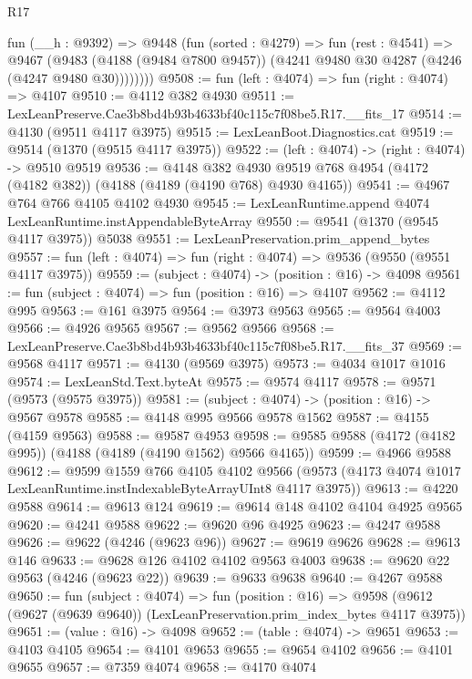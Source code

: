 \begin{lexlean}{R17}
\begin{coremodule}
        fun (__h : @9392) =>
        @9448
          (fun (sorted : @4279) =>
          fun (rest : @4541) =>
          @9467
            (@9483
              (@4188 (@9484 @7800 @9457))
              (@4241 @9480 @30 @4287 (@4246 (@4247 @9480 @30))))))))
@9508 := fun (left : @4074) => fun (right : @4074) => @4107
@9510 := @4112 @382 @4930
@9511 := LexLeanPreserve.Cae3b8bd4b93b4633bf40c115c7f08be5.R17.__fits_17
@9514 := @4130 (@9511 @4117 @3975)
@9515 := LexLeanBoot.Diagnostics.cat
@9519 := @9514 (@1370 (@9515 @4117 @3975))
@9522 := (left : @4074) -> (right : @4074) -> @9510 @9519
@9536 := @4148
    @382
    @4930
    @9519
    @768
    @4954
    (@4172 (@4182 @382))
    (@4188 (@4189 (@4190 @768) @4930 @4165))
@9541 := @4967 @764 @766 @4105 @4102 @4930
@9545 := LexLeanRuntime.append @4074 LexLeanRuntime.instAppendableByteArray
@9550 := @9541 (@1370 (@9545 @4117 @3975)) @5038
@9551 := LexLeanPreservation.prim_append_bytes
@9557 := fun (left : @4074) => fun (right : @4074) => @9536 (@9550 (@9551 @4117 @3975))
@9559 := (subject : @4074) -> (position : @16) -> @4098
@9561 := fun (subject : @4074) => fun (position : @16) => @4107
@9562 := @4112 @995
@9563 := @161 @3975
@9564 := @3973 @9563
@9565 := @9564 @4003
@9566 := @4926 @9565
@9567 := @9562 @9566
@9568 := LexLeanPreserve.Cae3b8bd4b93b4633bf40c115c7f08be5.R17.__fits_37
@9569 := @9568 @4117
@9571 := @4130 (@9569 @3975)
@9573 := @4034 @1017 @1016
@9574 := LexLeanStd.Text.byteAt
@9575 := @9574 @4117
@9578 := @9571 (@9573 (@9575 @3975))
@9581 := (subject : @4074) -> (position : @16) -> @9567 @9578
@9585 := @4148 @995 @9566 @9578 @1562
@9587 := @4155 (@4159 @9563)
@9588 := @9587 @4953
@9598 := @9585 @9588 (@4172 (@4182 @995)) (@4188 (@4189 (@4190 @1562) @9566 @4165))
@9599 := @4966 @9588
@9612 := @9599
    @1559
    @766
    @4105
    @4102
    @9566
    (@9573 (@4173 @4074 @1017 LexLeanRuntime.instIndexableByteArrayUInt8 @4117 @3975))
@9613 := @4220 @9588
@9614 := @9613 @124
@9619 := @9614 @148 @4102 @4104 @4925 @9565
@9620 := @4241 @9588
@9622 := @9620 @96 @4925
@9623 := @4247 @9588
@9626 := @9622 (@4246 (@9623 @96))
@9627 := @9619 @9626
@9628 := @9613 @146
@9633 := @9628 @126 @4102 @4102 @9563 @4003
@9638 := @9620 @22 @9563 (@4246 (@9623 @22))
@9639 := @9633 @9638
@9640 := @4267 @9588
@9650 := fun (subject : @4074) =>
  fun (position : @16) =>
  @9598 (@9612 (@9627 (@9639 @9640)) (LexLeanPreservation.prim_index_bytes @4117 @3975))
@9651 := (value : @16) -> @4098
@9652 := (table : @4074) -> @9651
@9653 := @4103 @4105
@9654 := @4101 @9653
@9655 := @9654 @4102
@9656 := @4101 @9655
@9657 := @7359 @4074
@9658 := @4170 @4074

\end{coremodule}
\end{lexlean}
